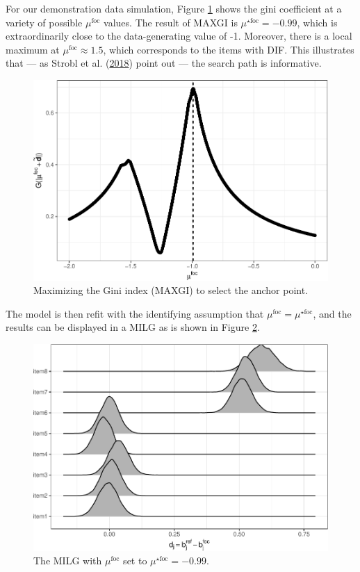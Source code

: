 \documentclass[
  11pt,
]{article}
\begin{document}
For our demonstration data simulation, Figure \ref{fig:ginipath} shows the gini coefficient at a variety of possible \(\mu^\text{foc}\) values. The result of MAXGI is \(\mu^{\star\text{foc}} = -0.99\), which is extraordinarily close to the data-generating value of -1. Moreover, there is a local maximum at \(\mu^{\text{foc}} \approx 1.5\), which corresponds to the items with DIF. This illustrates that --- as Strobl et al. (\protect\hyperlink{ref-strobl2018anchor}{2018}) point out --- the search path is informative.

\begin{figure}[H]

{\centering \includegraphics[width=0.7\linewidth]{paper_files/figure-latex/ginipath-1} 

}

\caption{Maximizing the Gini index (MAXGI) to select the anchor point.}\label{fig:ginipath}
\end{figure}

The model is then refit with the identifying assumption that \(\mu^{\text{foc}} = \mu^{\star\text{foc}}\), and the results can be displayed in a MILG as is shown in Figure \ref{fig:ginimilg}.

\begin{figure}[H]

{\centering \includegraphics[width=0.7\linewidth]{paper_files/figure-latex/ginimilg-1} 

}

\caption{The MILG with $\mu^{\text{foc}}$ set to $\mu^{\star\text{foc}} = -0.99$.}\label{fig:ginimilg}
\end{figure}
\end{document}
